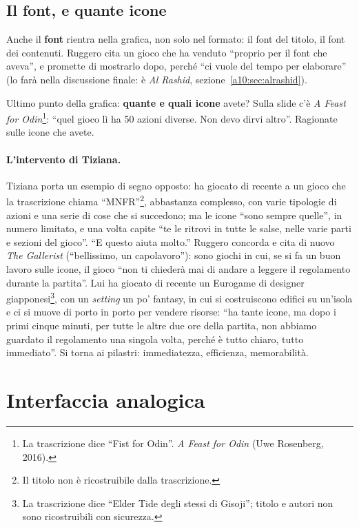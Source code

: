 \subsection{Il font, e quante icone}

Anche il \textbf{font} rientra nella grafica, non solo nel formato: il font del titolo,
il font dei contenuti. Ruggero cita un gioco che ha venduto ``proprio per il font che
aveva'', e promette di mostrarlo dopo, perché ``ci vuole del tempo per elaborare''
(lo farà nella discussione finale: è \emph{Al Rashid}, sezione~\ref{a10:sec:alrashid}).

Ultimo punto della grafica: \textbf{quante e quali icone} avete? Sulla slide c'è \emph{A
Feast for Odin}\footnote{La trascrizione dice ``Fist for Odin''. \emph{A Feast for
Odin} (Uwe Rosenberg, 2016).}: ``quel gioco lì ha 50 azioni diverse. Non devo dirvi
altro''. Ragionate sulle icone che avete.

\paragraph{L'intervento di Tiziana.} Tiziana porta un esempio di segno opposto: ha
giocato di recente a un gioco che la trascrizione chiama ``MNFR''\footnote{Il titolo
non è ricostruibile dalla trascrizione.}, abbastanza complesso, con varie tipologie di
azioni e una serie di cose che si succedono; ma le icone ``sono sempre quelle'', in
numero limitato, e una volta capite ``te le ritrovi in tutte le salse, nelle varie parti
e sezioni del gioco''. ``E questo aiuta molto.'' Ruggero concorda e cita di nuovo
\emph{The Gallerist} (``bellissimo, un capolavoro''): sono giochi in cui, se si fa un
buon lavoro sulle icone, il gioco ``non ti chiederà mai di andare a leggere il
regolamento durante la partita''. Lui ha giocato di recente un Eurogame di designer
giapponesi\footnote{La trascrizione dice ``Elder Tide degli stessi di Gisoji''; titolo
e autori non sono ricostruibili con sicurezza.}, con un \emph{setting} un po' fantasy, in
cui si costruiscono edifici su un'isola e ci si muove di porto in porto per vendere
risorse: ``ha tante icone, ma dopo i primi cinque minuti, per tutte le altre due ore
della partita, non abbiamo guardato il regolamento una singola volta, perché è tutto
chiaro, tutto immediato''. Si torna ai pilastri: immediatezza, efficienza,
memorabilità.

\section{Interfaccia analogica}
\label{a10:sec:interfaccia}

